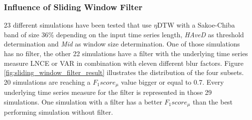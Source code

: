\subsubsection{Influence of Sliding Window Filter} \label{influence_of_sliding_window_filter}
23 different simulations have been tested that use $\eta$DTW with a Sakoe-Chiba band of size 36\% depending on the input
time series length, \textit{HAveD} as threshold determination and \textit{Mid} as window size determination. One of
those simulations has no filter, the other 22 simulations have a filter with the underlying time series measure LNCE or
VAR in combination with eleven different blur factors. Figure \ref{fig:sliding_window_filter_result} illustrates the
distribution of the four subsets. 20 simulations are reaching a $F_{1}score_{\mu}$ value bigger or equal to 0.7. Every
underlying time series measure for the filter is represented in those 29 simulations. One simulation with a filter has a
better $F_{1}score_{\mu}$ than the best performing simulation without filter.

